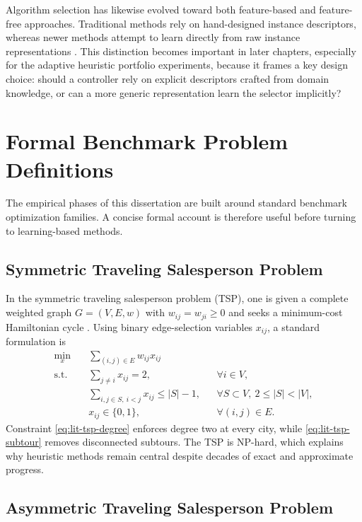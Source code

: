 Algorithm selection has likewise evolved toward both feature-based and feature-free approaches.
Traditional methods rely on hand-designed instance descriptors, whereas newer methods attempt to
learn directly from raw instance representations \cite{alissa2023}. This distinction becomes
important in later chapters, especially for the adaptive heuristic portfolio experiments, because
it frames a key design choice: should a controller rely on explicit descriptors crafted from domain
knowledge, or can a more generic representation learn the selector implicitly?

\section{Formal Benchmark Problem Definitions}
\label{sec:lit-problems}

The empirical phases of this dissertation are built around standard benchmark optimization
families. A concise formal account is therefore useful before turning to learning-based methods.

\subsection{Symmetric Traveling Salesperson Problem}
\label{sec:lit-tsp}

In the symmetric traveling salesperson problem (TSP), one is given a complete weighted graph
$G = (V,E,w)$ with $w_{ij} = w_{ji} \geq 0$ and seeks a minimum-cost Hamiltonian cycle
\cite{reinelt1991}. Using binary edge-selection variables $x_{ij}$, a standard formulation is
\begin{align}
\min_{x} \quad & \sum_{(i,j)\in E} w_{ij}x_{ij} \label{eq:lit-tsp-obj} \\
\text{s.t.} \quad
& \sum_{j \neq i} x_{ij} = 2, && \forall i \in V, \label{eq:lit-tsp-degree}\\
& \sum_{i,j \in S,\ i<j} x_{ij} \le |S|-1, && \forall S \subset V,\ 2 \le |S| < |V|, \label{eq:lit-tsp-subtour}\\
& x_{ij} \in \{0,1\}, && \forall (i,j)\in E. \label{eq:lit-tsp-binary}
\end{align}
Constraint \eqref{eq:lit-tsp-degree} enforces degree two at every city, while
\eqref{eq:lit-tsp-subtour} removes disconnected subtours. The TSP is NP-hard, which explains why
heuristic methods remain central despite decades of exact and approximate progress.

\subsection{Asymmetric Traveling Salesperson Problem}
\label{sec:lit-atsp}

